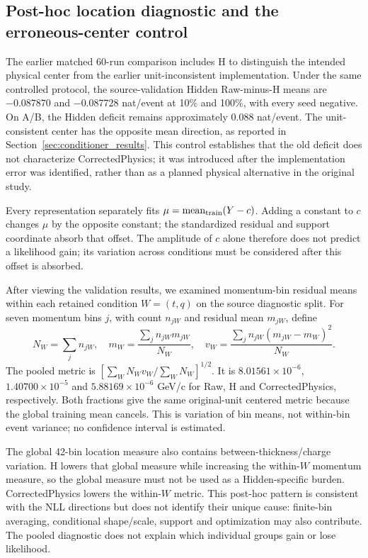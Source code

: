 \subsection{Post-hoc location diagnostic and the erroneous-center control}
\label{sec:location_results}

The earlier matched 60-run comparison includes H to distinguish the intended physical
center from the earlier unit-inconsistent implementation. Under the same
controlled protocol, the source-validation Hidden Raw-minus-H means are
$-0.087870$ and $-0.087728$ nat/event at 10\% and 100\%, with every seed
negative. On A/B, the Hidden deficit remains approximately $0.088$ nat/event.
The unit-consistent center has the opposite mean direction, as reported in
Section~\ref{sec:conditioner_results}. This control establishes that the old
deficit does not characterize CorrectedPhysics; it was introduced after the
implementation error was identified, rather than as a planned physical
alternative in the original study.

Every representation separately fits $\mu=\operatorname{mean}_{\rm train}(Y-c)$.
Adding a constant to $c$ changes $\mu$ by the opposite constant; the standardized
residual and support coordinate absorb that offset. The amplitude of $c$ alone therefore does not predict a likelihood gain;
its variation across conditions must be considered after this offset is absorbed.

After viewing the validation results, we examined momentum-bin residual means
within each retained condition $W=(t,q)$ on the source diagnostic split. For
seven momentum bins $j$, with count $n_{jW}$ and residual mean $m_{jW}$, define
\begin{equation}
 N_W=\sum_j n_{jW},\quad
 m_W=\frac{\sum_j n_{jW}m_{jW}}{N_W},\quad
 v_W=\frac{\sum_j n_{jW}(m_{jW}-m_W)^2}{N_W}.
\end{equation}
The pooled metric is $[\sum_W N_W v_W/\sum_W N_W]^{1/2}$.
It is $8.01561\times10^{-6}$, $1.40700\times10^{-5}$ and
$5.88169\times10^{-6}$ GeV/c for Raw, H and CorrectedPhysics, respectively.
Both fractions give the same original-unit centered metric because the global
training mean cancels. This is variation of bin means, not within-bin event
variance; no confidence interval is estimated.

The global 42-bin location measure also contains between-thickness/charge
variation. H lowers that global measure while increasing the within-$W$
momentum measure, so the global measure must not be used as a Hidden-specific
burden. CorrectedPhysics lowers the within-$W$ metric. This post-hoc pattern is
consistent with the NLL directions but does not identify their unique cause:
finite-bin averaging, conditional shape/scale, support and optimization may
also contribute. The pooled diagnostic does not explain which individual
groups gain or lose likelihood.

